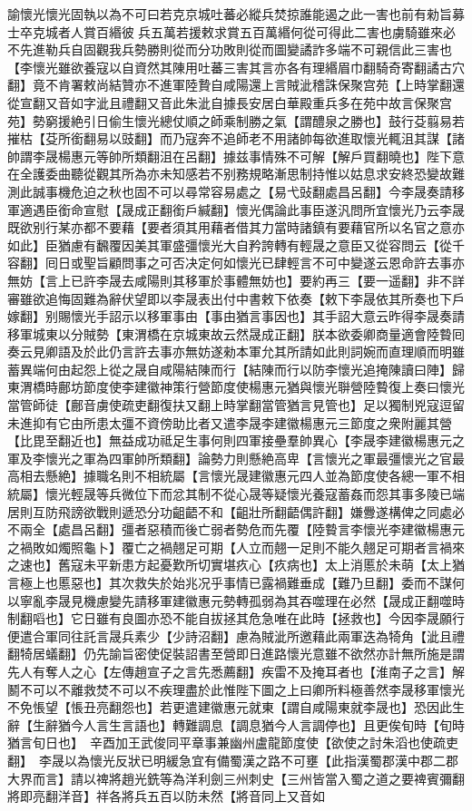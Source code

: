 諭懷光懷光固執以為不可曰若克京城吐蕃必縱兵焚掠誰能遏之此一害也前有勑旨募士卒克城者人賞百緡彼兵五萬若援敕求賞五百萬緡何從可得此二害也虜騎雖來必不先進勒兵自固觀我兵勢勝則從而分功敗則從而圖變譎詐多端不可親信此三害也【李懷光雖欲養寇以自資然其陳用吐蕃三害其言亦各有理緡眉巾翻騎奇寄翻譎古穴翻】竟不肯署敕尚結贊亦不進軍陸贄自咸陽還上言賊泚稽誅保聚宫苑【上時掌翻還從宣翻又音如字泚且禮翻又音此朱泚自據長安居白華殿重兵多在苑中故言保聚宫苑】勢窮援絶引日偷生懷光總仗順之師乘制勝之氣【謂醴泉之勝也】鼓行芟翦易若摧枯【芟所銜翻易以豉翻】而乃寇奔不追師老不用諸帥每欲進取懷光輒沮其謀【諸帥謂李晟楊惠元等帥所類翻沮在呂翻】據兹事情殊不可解【解戶買翻曉也】陛下意在全護委曲聽從觀其所為亦未知感若不别務規略漸思制持惟以姑息求安終恐變故難測此誠事機危迫之秋也固不可以尋常容易處之【易弋䜴翻處昌呂翻】今李晟奏請移軍適遇臣銜命宣慰【晟成正翻銜戶緘翻】懷光偶論此事臣遂汎問所宜懷光乃云李晟既欲别行某亦都不要藉【要者須其用藉者借其力當時諸鎮有要藉官所以名官之意亦如此】臣猶慮有飜覆因美其軍盛彊懷光大自矜誇轉有輕晟之意臣又從容問云【從千容翻】囘日或聖旨顧問事之可否决定何如懷光已肆輕言不可中變遂云恩命許去事亦無妨【言上已許李晟去咸陽則其移軍於事體無妨也】要約再三【要一遥翻】非不詳審雖欲追悔固難為辭伏望即以李晟表出付中書敕下依奏【敕下李晟依其所奏也下戶嫁翻】别賜懷光手詔示以移軍事由【事由猶言事因也】其手詔大意云昨得李晟奏請移軍城東以分賊勢【東渭橋在京城東故云然晟成正翻】朕本欲委卿商量適會陸䞇囘奏云見卿語及於此仍言許去事亦無妨遂勑本軍允其所請如此則詞婉而直理順而明雖蓄異端何由起怨上從之晟自咸陽結陳而行【結陳而行以防李懷光追掩陳讀曰陣】歸東渭橋時鄜坊節度使李建徽神策行營節度使楊惠元猶與懷光聨營陸䞇復上奏曰懷光當管師徒【鄜音虜使疏吏翻復扶又翻上時掌翻當管猶言見管也】足以獨制兇寇逗留未進抑有它由所患太彊不資傍助比者又遣李晟李建徽楊惠元三節度之衆附麗其營【比毘至翻近也】無益成功祗足生事何則四軍接壘羣帥異心【李晟李建徽楊惠元之軍及李懷光之軍為四軍帥所類翻】論勢力則懸絶高卑【言懷光之軍最彊懷光之官最高相去懸絶】據職名則不相統屬【言懷光晟建徽惠元四人並為節度使各總一軍不相統屬】懷光輕晟等兵微位下而忿其制不從心晟等疑懷光養寇蓄姦而怨其事多陵已端居則互防飛謗欲戰則遞恐分功齟齬不和【齟壯所翻齬偶許翻】嫌釁遂構俾之同處必不兩全【處昌呂翻】彊者惡積而後亡弱者勢危而先覆【陸䞇言李懷光李建徽楊惠元之禍敗如燭照龜卜】覆亡之禍翹足可期【人立而翹一足則不能久翹足可期者言禍來之速也】舊寇未平新患方起憂歎所切實堪疚心【疚病也】太上消慝於未萌【太上猶言極上也慝惡也】其次救失於始兆况乎事情已露禍難垂成【難乃旦翻】委而不謀何以寧亂李晟見機慮變先請移軍建徽惠元勢轉孤弱為其吞噬理在必然【晟成正翻噬時制翻㗖也】它日雖有良圖亦恐不能自拔拯其危急唯在此時【拯救也】今因李晟願行便遣合軍同往託言晟兵素少【少詩沼翻】慮為賊泚所邀藉此兩軍迭為犄角【泚且禮翻犄居蟻翻】仍先諭旨密使促裝詔書至營即日進路懷光意雖不欲然亦計無所施是謂先人有奪人之心【左傳趙宣子之言先悉薦翻】疾雷不及掩耳者也【淮南子之言】解鬭不可以不離救焚不可以不疾理盡於此惟陛下圖之上曰卿所料極善然李晟移軍懷光不免悵望【悵丑亮翻怨也】若更遣建徽惠元就東【謂自咸陽東就李晟也】恐因此生辭【生辭猶今人言生言語也】轉難調息【調息猶今人言調停也】且更俟旬時【旬時猶言旬日也】　辛酉加王武俊同平章事兼幽州盧龍節度使【欲使之討朱滔也使疏吏翻】　李晟以為懷光反狀已明緩急宜有備蜀漢之路不可壅【此指漢蜀郡漢中郡二郡大界而言】請以禆將趙光銑等為洋利劍三州刺史【三州皆當入蜀之道之要禆賓彌翻將即亮翻洋音】祥各將兵五百以防未然【將音同上又音如
